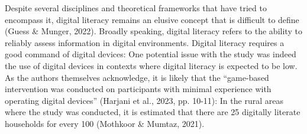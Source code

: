\documentclass[authordate, reflection, issue]{jote-new-article}
\begin{document}
	Despite several disciplines and theoretical frameworks that have tried to encompass it, digital literacy remains an elusive concept that is difficult to define (Guess \& Munger, 2022). Broadly speaking, digital literacy refers to the ability to reliably assess information in digital environments. Digital literacy requires a good command of digital devices: One potential issue with the study was indeed the use of digital devices in contexts where digital literacy is expected to be low. As the authors themselves acknowledge, it is likely that the “game-based intervention was conducted on participants with minimal experience with operating digital devices” (Harjani et al., 2023, pp. 10-11): In the rural areas where the study was conducted, it is estimated that there are 25 digitally literate households for every 100 (Mothkoor \& Mumtaz, 2021).
\end{document}
